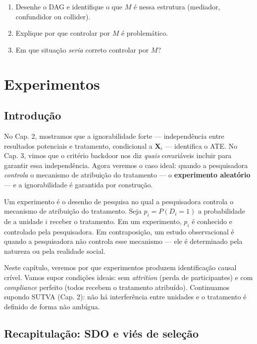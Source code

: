 \documentclass[
]{article}
\begin{document}
\begin{enumerate}
\def\labelenumi{(\alph{enumi})}
\item
  Desenhe o DAG e identifique o que \(M\) é nessa estrutura (mediador, confundidor ou collider).
\item
  Explique por que controlar por \(M\) é problemático.
\item
  Em que situação \emph{seria} correto controlar por \(M\)?
\end{enumerate}

\section{Experimentos}\label{experimentos}

\subsection{Introdução}\label{introduuxe7uxe3o-2}

No Cap. 2, mostramos que a ignorabilidade forte --- independência entre resultados potenciais e tratamento, condicional a \(\mathbf{X}_i\) --- identifica o ATE. No Cap. 3, vimos que o critério backdoor nos diz \emph{quais} covariáveis incluir para garantir essa independência. Agora veremos o caso ideal: quando a pesquisadora \emph{controla} o mecanismo de atribuição do tratamento --- o \textbf{experimento aleatório} --- e a ignorabilidade é garantida por construção.

Um experimento é o desenho de pesquisa no qual a pesquisadora controla o mecanismo de atribuição do tratamento. Seja \(p_i = P(D_i = 1)\) a probabilidade de a unidade \(i\) receber o tratamento. Em um experimento, \(p_i\) é conhecido e controlado pela pesquisadora. Em contraposição, um estudo observacional é quando a pesquisadora não controla esse mecanismo --- ele é determinado pela natureza ou pela realidade social.

Neste capítulo, veremos por que experimentos produzem identificação causal crível. Vamos supor condições ideais: sem \emph{attrition} (perda de participantes) e com \emph{compliance} perfeito (todos recebem o tratamento atribuído). Continuamos supondo SUTVA (Cap. 2): não há interferência entre unidades e o tratamento é definido de forma não ambígua.

\subsection{Recapitulação: SDO e viés de seleção}\label{recapitulauxe7uxe3o-sdo-e-viuxe9s-de-seleuxe7uxe3o}
\end{document}
